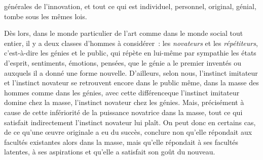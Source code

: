 \documentclass[french,twoside]{book} %
\begin{document}
générales de l’innovation, et tout ce qui est individuel, personnel, original, génial, tombe sous les mêmes lois.\par
Dès lors, dans le monde particulier de l’art comme dans le monde social tout entier, il y a deux classes d’hommes à considérer : les \emph{novateurs} et les \emph{répétiteurs}, c’est-à-dire les génies et le public, qui répète en lui-même par sympathie les états d’esprit, sentiments, émotions, pensées, que le génie a le premier inventés ou auxquels il a donné une forme nouvelle. D’ailleurs, selon nous, l’instinct imitateur et l’instinct novateur se retrouvent encore dans le public même, dans la masse des hommes comme dans les génies, avec cette différenceque l’instinct imitateur domine chez la masse, l’instinct novateur chez les génies. Mais, précisément à cause de cette infériorité de la puissance novatrice dans la masse, tout ce qui satisfait indirectement l’instinct novateur lui plaît. On peut donc en certains cas, de ce qu’une œuvre originale a eu du succès, conclure non qu’elle répondait aux facultés existantes alors dans la masse, mais qu’elle répondait à ses facultés latentes, à ses aspirations et qu’elle a satisfait son goût du nouveau.\par
\end{document}
